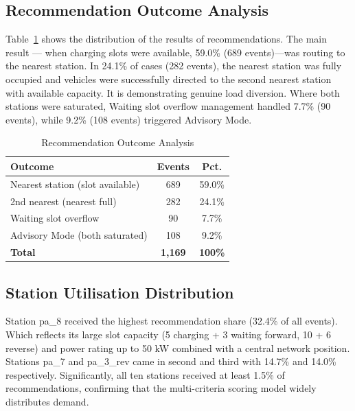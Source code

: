 \documentclass[conference]{IEEEtran}
\begin{document}
\subsection{Recommendation Outcome Analysis}

Table~\ref{tab:outcomes} shows the distribution of the results of
recommendations. The main result --- when charging slots were available,
59.0\% (689 events)---was routing to the nearest station. In 24.1\% of
cases (282 events), the nearest station was fully occupied and vehicles
were successfully directed to the second nearest station with available
capacity. It is demonstrating genuine load diversion. Where both
stations were saturated, Waiting slot overflow management handled 7.7\%
(90 events), while 9.2\% (108 events) triggered Advisory Mode.

\begin{table}[htbp]
\caption{Recommendation Outcome Analysis}
\label{tab:outcomes}
\begin{center}
\begin{tabular}{|l|c|c|}
\hline
\textbf{Outcome} & \textbf{Events} & \textbf{Pct.} \\
\hline
Nearest station (slot available)  & 689 & 59.0\% \\
\hline
2nd nearest (nearest full)        & 282 & 24.1\% \\
\hline
Waiting slot overflow             & 90  &  7.7\% \\
\hline
Advisory Mode (both saturated)    & 108 &  9.2\% \\
\hline
\textbf{Total}                    & \textbf{1,169} & \textbf{100\%} \\
\hline
\end{tabular}
\end{center}
\end{table}

\subsection{Station Utilisation Distribution}

Station pa\_8 received the highest recommendation share (32.4\% of all
events). Which reflects its large slot capacity (5 charging + 3 waiting
forward, 10 + 6 reverse) and power rating up to 50 kW combined with a
central network position. Stations pa\_7 and pa\_3\_rev came in second
and third with 14.7\% and 14.0\% respectively. Significantly, all ten
stations received at least 1.5\% of recommendations, confirming that
the multi-criteria scoring model widely distributes demand.
\end{document}
